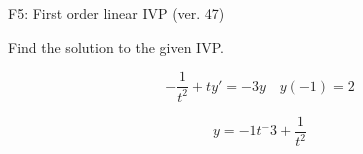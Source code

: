 \begin{exercise}
  \begin{exerciseTitle}F5: First order linear IVP (ver. 47)\end{exerciseTitle}
  \begin{exerciseStatement}
    
Find the solution to the given IVP.

    
\[-\frac{1}{t^{2}} +ty'= -3 y \hspace{1em} y( -1 ) = 2\]

  \end{exerciseStatement}
  \begin{exerciseAnswer}
    
\[y= -1 t^ -3 + \frac{1}{t^{2}}\]

  \end{exerciseAnswer}
\end{exercise}